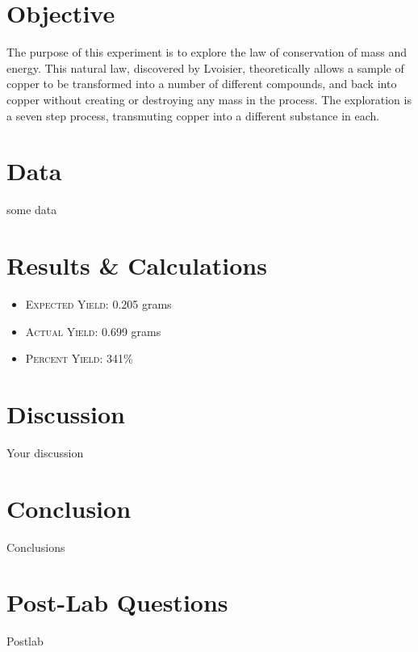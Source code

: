 \documentclass[11pt,letterpaper]{report}
\begin{document}

\pagebreak

\section*{Objective}
The purpose of this experiment is to explore the law of conservation of mass and energy. This natural law, discovered by Lvoisier, theoretically allows a sample of copper to be transformed into a number of different compounds, and back into copper without creating or destroying any mass in the process. The exploration is a seven step process, transmuting copper into a different substance in each.

\section*{Data}
some data

\section*{Results \& Calculations}
\begin{itemize}
\item \textsc{Expected Yield:} 0.205 grams
\item \textsc{Actual Yield:} 0.699 grams
\item \textsc{Percent Yield:} 341\%
\end{itemize}

\section*{Discussion}
Your discussion

\section*{Conclusion}
Conclusions

\section*{Post-Lab Questions}
Postlab
\end{document}
